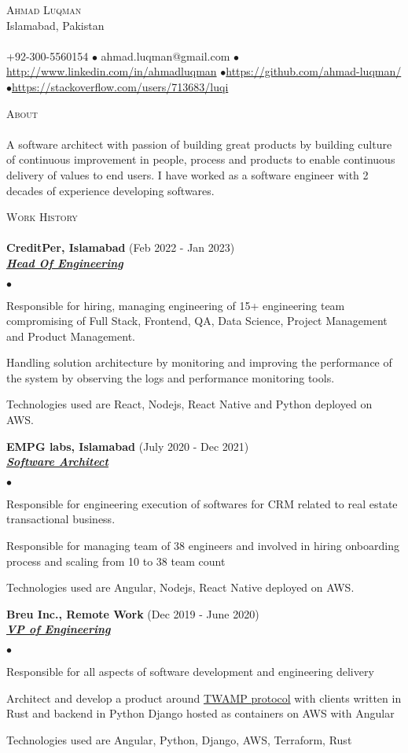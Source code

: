 \documentclass{article}
\newcommand{\lineunder}{\vspace*{-8pt} \\ \hspace*{-18pt} \hrulefill \\}
\newcommand{\header}[1]{{\hspace*{-15pt}\vspace*{6pt} \textsc{#1}} \vspace*{-6pt} \lineunder}
\newcommand{\employer}[3]{{ \textbf{#1} (#2)\\ \underline{\textbf{\emph{#3}}}\\  }}
\newcommand{\contact}[3]{
\vspace*{-8pt}
\begin{center}
{\LARGE \scshape {#1}}\\
#2 \lineunder 
#3
\end{center}
\vspace*{-8pt}
}
\newenvironment{achievements}{\begin{list}{$\bullet$}{\topsep 0pt \itemsep -2pt}}{\vspace*{4pt}\end{list}}
\begin{document}
\small
\smallskip
\vspace*{-44pt}

\contact{Ahmad Luqman}
{Islamabad, Pakistan}
{+92-300-5560154 $\bullet$ ahmad.luqman@gmail.com  $\bullet$\url{http://www.linkedin.com/in/ahmadluqman} $\bullet$\url{https://github.com/ahmad-luqman/} $\bullet$\url{https://stackoverflow.com/users/713683/luqi}}

\header{About}
A software architect with passion of building great products by building culture of continuous improvement in people, process and products to enable continuous delivery of values to end users. I have worked as a software engineer with 2 decades of experience developing softwares.
\vspace*{6pt}

\header{Work History}
\employer{CreditPer, Islamabad}{Feb 2022 - Jan 2023}{Head Of Engineering}
		\begin{achievements}
		\item Responsible for hiring, managing engineering of 15+ engineering team compromising of Full Stack, Frontend, QA, Data Science, Project Management and Product Management.
		\item Handling solution architecture by monitoring and improving the performance of the system by observing the logs and performance monitoring tools.
		\item Technologies used are React, Nodejs, React Native and Python deployed on AWS.
		\end{achievements}

\employer{EMPG labs, Islamabad}{July 2020 - Dec 2021}{Software Architect}
    \begin{achievements}
    \item Responsible for engineering execution of softwares for CRM related to real estate transactional business.
    \item Responsible for managing team of 38 engineers and involved in hiring onboarding process and scaling from 10 to 38 team count
    \item Technologies used are Angular, Nodejs, React Native deployed on AWS.
    \end{achievements}

\employer{Breu Inc., Remote Work}{Dec 2019 - June 2020}{VP of Engineering}
	\begin{achievements}
	\item Responsible for all aspects of software development and engineering delivery
	\item Architect and develop a product around \href{https://tools.ietf.org/html/rfc5357}{TWAMP protocol} with clients written in Rust and backend in Python Django hosted as containers on AWS with Angular 
	\item Technologies used are Angular, Python, Django, AWS, Terraform, Rust
	\end{achievements}
\end{document}
